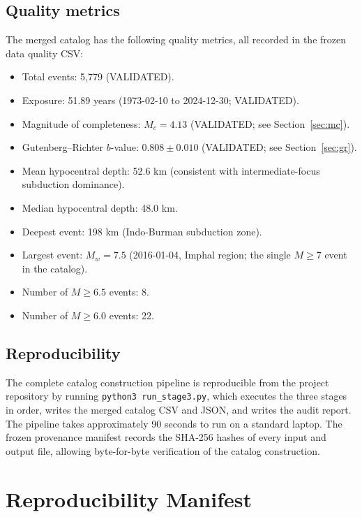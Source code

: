\documentclass[10pt,a4paper,twocolumn]{article}
\begin{document}
\subsection{Quality metrics}

The merged catalog has the following quality metrics, all recorded in the frozen data quality CSV:

\begin{itemize}[leftmargin=1.2em,itemsep=2pt,topsep=2pt]
\item Total events: 5{,}779 (VALIDATED).
\item Exposure: 51.89 years (1973-02-10 to 2024-12-30; VALIDATED).
\item Magnitude of completeness: $M_c = 4.13$ (VALIDATED; see Section~\ref{sec:mc}).
\item Gutenberg--Richter $b$-value: $0.808 \pm 0.010$ (VALIDATED; see Section~\ref{sec:gr}).
\item Mean hypocentral depth: 52.6 km (consistent with intermediate-focus subduction dominance).
\item Median hypocentral depth: 48.0 km.
\item Deepest event: 198 km (Indo-Burman subduction zone).
\item Largest event: $M_w = 7.5$ (2016-01-04, Imphal region; the single $M\geq7$ event in the catalog).
\item Number of $M\geq6.5$ events: 8.
\item Number of $M\geq6.0$ events: 22.
\end{itemize}

\subsection{Reproducibility}

The complete catalog construction pipeline is reproducible from the project repository by running \texttt{python3 run\_stage3.py}, which executes the three stages in order, writes the merged catalog CSV and JSON, and writes the audit report. The pipeline takes approximately 90 seconds to run on a standard laptop. The frozen provenance manifest records the SHA-256 hashes of every input and output file, allowing byte-for-byte verification of the catalog construction.

\section{Reproducibility Manifest}\label{app:reproducibility}
\end{document}
